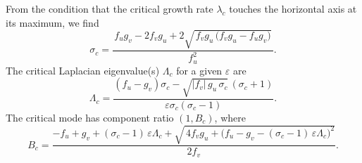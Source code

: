 From the condition that the critical growth rate \(\lambda_c\) touches the horizontal axis at its maximum, we find
\begin{equation}
\sigma_c
= \frac{\,f_u g_v - 2 f_v g_u
    + 2\sqrt{\,f_v g_u \,\bigl(f_v g_u - f_u g_v\bigr)}\,}{f_u^{2}}.
\end{equation}
The critical Laplacian eigenvalue(s) \(\Lambda_c\) for a given \(\varepsilon\) are
\begin{equation}
    \Lambda_c = \frac{(f_u - g_v)\sigma_c - \sqrt{|f_v|\,g_u\,\sigma_c}\,(\sigma_c + 1)}{\varepsilon \sigma_c(\sigma_c-1)}.
\end{equation}
The critical mode has component ratio \((1, B_c)\), where
\begin{equation}
    B_{c}
= \frac{-f_{u} + g_{v} + (\sigma_{c}-1)\,\varepsilon \Lambda_{c}
        + \sqrt{\,4 f_{v} g_{u} + \bigl(f_{u} - g_{v} - (\sigma_{c}-1)\,\varepsilon \Lambda_{c}\bigr)^{2}}}
       {2 f_{v}}.
\end{equation}

